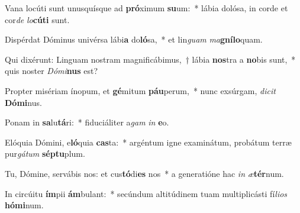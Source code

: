 \item Vana locúti sunt unusquísque ad \textbf{pró}ximum \textbf{su}um:~* lábia dolósa, in corde et cor\textit{de} \textit{lo}\textbf{cú}\textbf{ti} sunt.
\item Dispérdat Dóminus univérsa lábi\textbf{a} do\textbf{ló}sa,~* et lin\textit{guam} \textit{ma}\textbf{gní}\textbf{lo}quam.
\item Qui dixérunt: Linguam nostram magnificábimus,~† lábia \textbf{nos}tra a \textbf{no}bis sunt,~* quis noster \textit{Dó}\textit{mi}\textbf{nus} est?
\item Propter misériam ínopum, et \textbf{gé}mitum \textbf{páu}perum,~* nunc exsúrgam, \textit{di}\textit{cit} \textbf{Dó}\textbf{mi}nus.
\item Ponam in \textbf{sa}lu\textbf{tá}ri:~* fiduciáliter a\textit{gam} \textit{in} \textbf{e}o.
\item Elóquia Dómini, e\textbf{ló}quia \textbf{cas}ta:~* argéntum igne examinátum, probátum terræ pur\textit{gá}\textit{tum} \textbf{sép}\textbf{tu}plum.
\item Tu, Dómine, servábis nos: et cus\textbf{tó}di\textbf{es} nos~* a generatióne hac \textit{in} \textit{æ}\textbf{tér}num.
\item In circúitu \textbf{ím}pii \textbf{ám}bulant:~* secúndum altitúdinem tuam multiplicásti fí\textit{li}\textit{os} \textbf{hó}\textbf{mi}num.
